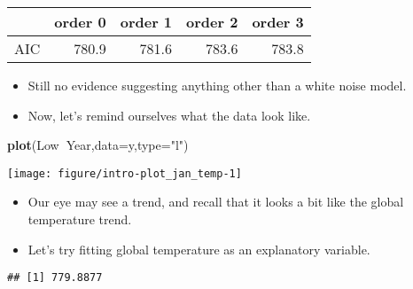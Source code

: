 \documentclass[]{article}
\newenvironment{Shaded}{\begin{snugshade}}{\end{snugshade}}
\newcommand{\KeywordTok}[1]{\textcolor[rgb]{0.13,0.29,0.53}{\textbf{#1}}}
\newcommand{\DataTypeTok}[1]{\textcolor[rgb]{0.13,0.29,0.53}{#1}}
\newcommand{\StringTok}[1]{\textcolor[rgb]{0.31,0.60,0.02}{#1}}
\newcommand{\OtherTok}[1]{\textcolor[rgb]{0.56,0.35,0.01}{#1}}
\newcommand{\OperatorTok}[1]{\textcolor[rgb]{0.81,0.36,0.00}{\textbf{#1}}}
\newcommand{\NormalTok}[1]{#1}
\begin{document}
\begin{longtable}[]{@{}lrrrr@{}}
\toprule
& order 0 & order 1 & order 2 & order 3\tabularnewline
\midrule
\endhead
AIC & 780.9 & 781.6 & 783.6 & 783.8\tabularnewline
\bottomrule
\end{longtable}

\begin{itemize}
\item
  Still no evidence suggesting anything other than a white noise model.
\item
  Now, let's remind ourselves what the data look like.
\end{itemize}

\begin{Shaded}
\begin{Highlighting}[]
\KeywordTok{plot}\NormalTok{(Low}\OperatorTok{~}\NormalTok{Year,}\DataTypeTok{data=}\NormalTok{y,}\DataTypeTok{type=}\StringTok{"l"}\NormalTok{)}
\end{Highlighting}
\end{Shaded}

\begin{center}\texttt{[image: figure/intro-plot\_jan\_temp-1]} \end{center}

\begin{itemize}
\item
  Our eye may see a trend, and recall that it looks a bit like the
  global temperature trend.
\item
  Let's try fitting global temperature as an explanatory variable.
\end{itemize}

\begin{Shaded}
\end{Shaded}

\begin{verbatim}
## [1] 779.8877
\end{verbatim}
\end{document}
